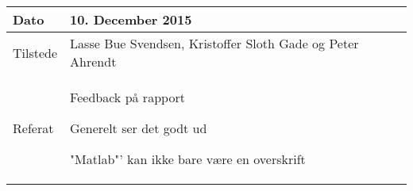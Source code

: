 \begin{center}
	\begin{tabular}{| l | p{10cm} |}
		\hline
		Dato		& 10. December 2015\\ \hline
		Tilstede 	& Lasse Bue Svendsen, Kristoffer Sloth Gade og Peter Ahrendt\\ \hline
		Referat		& \vspace{-5mm}\begin{myEnumerate}
			\item Feedback på rapport
			\begin{myItemize}
				\item Generelt ser det godt ud
				\item "Matlab"' kan ikke bare være en overskrift
			\end{myItemize}
			
		\end{myEnumerate}\\ 	
		\hline
	\end{tabular}
\end{center}